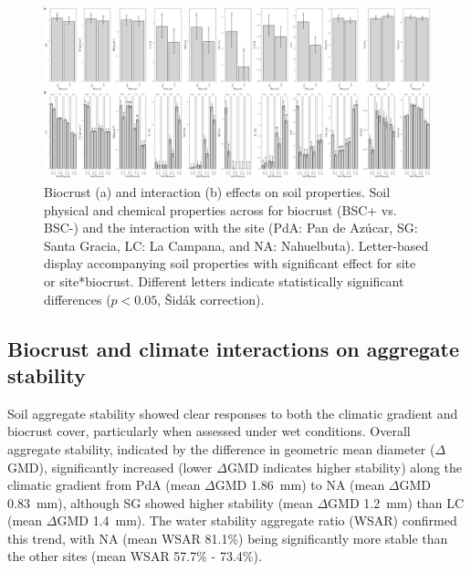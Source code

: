 \begin{figure}
    \centering
    \includegraphics[width=1\textwidth]{img/baseline_by_biocrust_interaction.png}
    \caption[Soil physical and chemical properties for the biocrust and interaction effects]{Biocrust (a) and interaction (b) effects on soil properties. Soil physical and chemical properties across for biocrust (BSC+ vs. BSC-) and the interaction with the site (PdA: Pan de Azúcar, SG: Santa Gracia, LC: La Campana, and NA: Nahuelbuta). Letter-based display accompanying soil properties with significant effect for site or site*biocrust. Different letters indicate statistically significant differences ($p < 0.05$, Šidák correction).} %
    \label{fig:baseline_biocrust_interaction}
\end{figure} %

\FloatBarrier

\subsection{Biocrust and climate interactions on aggregate stability}
\label{sec:BiocrusClimateInducedSoil}

Soil aggregate stability showed clear responses to both the climatic gradient and biocrust cover, particularly when assessed under wet conditions. Overall aggregate stability, indicated by the difference in geometric mean diameter ($\Delta$GMD), significantly increased (lower $\Delta$GMD indicates higher stability) along the climatic gradient from PdA (mean $\Delta$GMD \SI{1.86}{\milli\meter}) to NA (mean $\Delta$GMD \SI{0.83}{\milli\meter}), although SG showed higher stability (mean $\Delta$GMD \SI{1.2}{\milli\meter}) than LC (mean $\Delta$GMD \SI{1.4}{\milli\meter}). The water stability aggregate ratio (WSAR) confirmed this trend, with NA (mean WSAR 81.1\%) being significantly more stable than the other sites (mean WSAR 57.7\% - 73.4\%).

